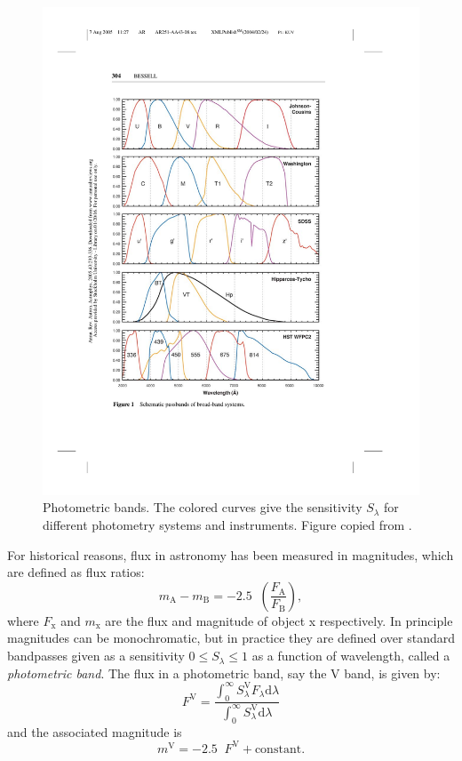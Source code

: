\documentclass[12pt]{article}
\numberwithin{equation}{section}
\def\dd{\mathrm{d}}
\def\Fla{\ensuremath{F_{\lambda}}}
\newcommand*{\logten}{\mathop{\log_{10}}}
\def\mA{\ensuremath{m_{\mathrm{A}}}}
\def\mB{\ensuremath{m_{\mathrm{B}}}}
\def\FA{\ensuremath{F_{\mathrm{A}}}}
\def\FB{\ensuremath{F_{\mathrm{B}}}}
\def\FV{\ensuremath{F^\mathrm{V}}}
\newcommand{\be}{\begin{equation}}
\newcommand{\ee}{\end{equation}}
\begin{document}
\begin{figure}
\centering
     \includegraphics[width=12cm]{figs/photometric_bands}
    \caption{Photometric bands. The colored curves give the sensitivity $S_\lambda$ for different photometry systems and instruments. Figure copied from \citet{2005ARA&A..43..293B}.
     \label{fig:photometric_bands}}
\end{figure}

For historical reasons, flux in astronomy has been measured in magnitudes, which are defined as flux ratios:
\be
\mA - \mB = -2.5 \logten \left( \frac{\FA}{\FB} \right),
\ee
where $F_\mathrm{x}$ and $m_\mathrm{x}$ are the flux  and magnitude of object x respectively. In principle magnitudes can be monochromatic, but in practice they are defined over standard bandpasses given as a sensitivity $0 \le S_\lambda \le 1$ as a function of wavelength, called a {\it photometric band}. The flux in a photometric band, say the V band, is given by:
\be
\FV = \frac{\int_0^\infty S_\lambda^\mathrm{V} \Fla \dd \lambda}{\int_0^\infty S_\lambda^\mathrm{V} \dd \lambda}
\ee
and the associated magnitude is 
\be
m^\mathrm{V} = -2.5 \logten \FV + \mathrm{constant}.
\ee 
\end{document}
